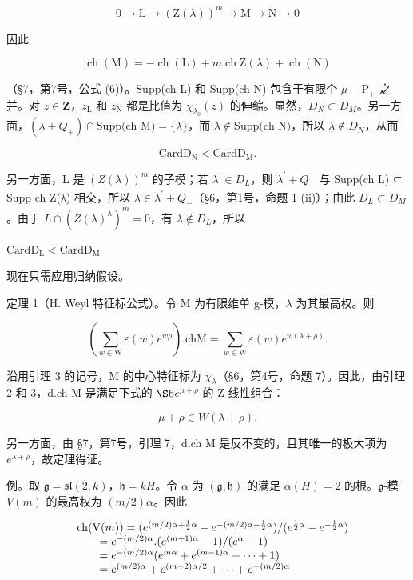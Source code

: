 \[
0 \to \mathrm{L} \to (\mathrm{Z} (\lambda)) ^ {m} \to \mathrm{M} \to \mathrm{N} \to 0
\]

因此

\[
\operatorname{ch} (\mathrm{M}) = - \operatorname{ch} (\mathrm{L}) + m \operatorname{ch} \mathrm{Z} (\lambda) + \operatorname{ch} (\mathrm{N})
\]

（§7，第7号，公式 (6)）。Supp(ch L) 和 Supp(ch N) 包含于有限个 \(\mu -\mathrm{P}_{+}\) 之并。对 \(z\in \mathbf{Z}\)，\(z_{\mathrm{L}}\) 和 \(z_{\mathrm{N}}\) 都是比值为 \(\chi_{\lambda_{0}}(z)\) 的伸缩。显然，\(D_{N} \subset D_{M}\)。另一方面，\((\lambda + Q_{+}) \cap \text{Supp(ch M)} = \{\lambda\}\)，而 \(\lambda \notin \text{Supp(ch N)}\)，所以 \(\lambda \notin D_{N}\)，从而

\[
\mathrm{Card} \mathrm{D} _ {\mathrm{N}} <   \mathrm{Card} \mathrm{D} _ {\mathrm{M}}.
\]

另一方面，L 是 \((Z(\lambda))^{m}\) 的子模；若 \(\lambda^{\prime} \in D_{L}\)，则 \(\lambda^{\prime} + Q_{+}\) 与 Supp(ch L) ⊂ Supp ch Z(λ) 相交，所以 \(\lambda \in \lambda^{\prime} + Q_{+}\)（§6，第1号，命题 1 (ii)）；由此 \(D_{L} \subset D_{M}\)。由于 \(L \cap (Z(\lambda)^{\lambda})^{m} = 0\)，有 \(\lambda \notin D_{L}\)，所以

\(\mathrm{CardD_L} <   \mathrm{CardD_M}\)

现在只需应用归纳假设。

定理 1（H. Weyl 特征标公式）。令 M 为有限维单 g-模，\(\lambda\) 为其最高权。则

\[
\left(\sum_ {w \in \mathrm{W}} \varepsilon (w) e ^ {w \rho}\right). \mathrm{chM} = \sum_ {w \in \mathrm{W}} \varepsilon (w) e ^ {w (\lambda + \rho)}.
\]

沿用引理 3 的记号，M 的中心特征标为 \(\chi_{\lambda}\)（§6，第4号，命题 7）。因此，由引理 2 和 3，d.ch M 是满足下式的 \(\S6\)\(e^{\mu+\rho}\) 的 Z-线性组合：

\[
\mu + \rho \in W (\lambda + \rho).
\]

另一方面，由 §7，第7号，引理 7，d.ch M 是反不变的，且其唯一的极大项为 \(e^{\lambda+\rho}\)，故定理得证。

例。取 \(\mathfrak{g} = \mathfrak{sl}(2,k)\)，\(\mathfrak{h} = kH\)。令 \(\alpha\) 为 \((\mathfrak{g},\mathfrak{h})\) 的满足 \(\alpha (H) = 2\) 的根。\(\mathfrak{g}\)-模 \(V(m)\) 的最高权为 \((m / 2)\alpha\)。因此

\[
\begin{array}{r l} & {\mathrm{ch} (\mathrm{V} (m)) = (e ^ {(m / 2) \alpha + \frac {1}{2} \alpha} - e ^ {- (m / 2) \alpha - \frac {1}{2} \alpha}) / (e ^ {\frac {1}{2} \alpha} - e ^ {- \frac {1}{2} \alpha})} \\ & {\qquad = e ^ {- (m / 2) \alpha}. (e ^ {(m + 1) \alpha} - 1) / (e ^ {\alpha} - 1)} \\ & {\qquad = e ^ {- (m / 2) \alpha} (e ^ {m \alpha} + e ^ {(m - 1) \alpha} + \dots + 1)} \\ & {\qquad = e ^ {(m / 2) \alpha} + e ^ {(m - 2) \alpha / 2} + \dots + e ^ {- (m / 2) \alpha}} \end{array}
\]

